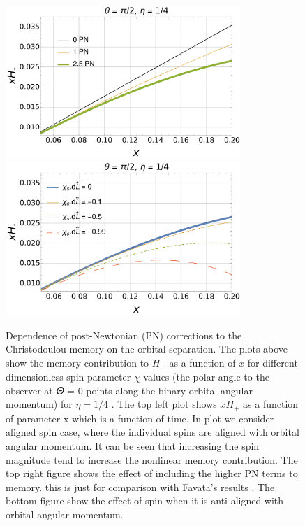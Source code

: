 \documentclass[twocolumn,showpacs,aps,prd,nobibnotes,floatfix]{revtex4-1}
\begin{document}
\begin{widetext}
\begin{figure}
	\includegraphics[width=3.5in]{../plots/PNmemoryFavata.pdf}
	\includegraphics[width=3.5in]{../plots/PNmemorycontributionHpAntiAlginedSpin.pdf}
	\caption{Dependence of post-Newtonian (PN) corrections to the Christodoulou memory on the orbital separation. The plots above show the memory contribution to $H_+$  as a function of $x$ for different dimensionless spin parameter $\chi$ values (the polar angle to the observer at 𝛩 = 0 points along the binary orbital angular momentum) for $\eta=1/4 $ . The top left plot shows $x H_+$ as a function of parameter x which is a function of time. In plot we consider aligned spin case, where the individual spins are aligned with orbital angular momentum. It can be seen that increasing the spin magnitude tend to increase the nonlinear memory contribution. The top right figure shows the effect of including the higher PN terms to memory. this is just for comparison with Favata's results \cite{Favata2009}. The bottom figure show the effect of spin when it is anti aligned with orbital angular momentum.   
		}
	\label{fig:HpVsX}
\end{figure}
\end{widetext}
\end{document}
